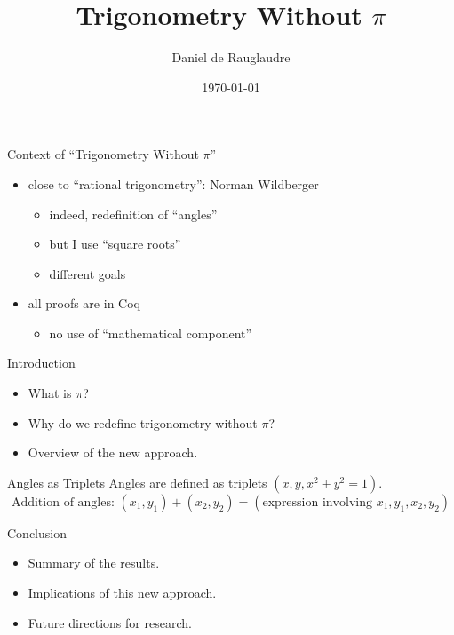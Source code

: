 \documentclass{beamer}
\title{Trigonometry Without $\pi$}
\author{Daniel de Rauglaudre}
\date{\today}
\begin{document}
\begin{frame}
    \titlepage
\end{frame}

\begin{frame}{}
\end{frame}

\begin{frame}{Context of ``Trigonometry Without $\pi$''}
  \begin{itemize}
    \item close to ``rational trigonometry'':  Norman Wildberger
      \begin{itemize}
      \item indeed, redefinition of ``angles''
      \item but I use ``square roots''
      \item different goals
      \end{itemize}
    \item all proofs are in Coq
      \begin{itemize}
      \item no use of ``mathematical component''
      \end{itemize}
  \end{itemize}
\end{frame}

\begin{frame}{Introduction}
    \begin{itemize}
        \item What is $\pi$?
        \item Why do we redefine trigonometry without $\pi$?
        \item Overview of the new approach.
    \end{itemize}
\end{frame}

\begin{frame}{Angles as Triplets}
    Angles are defined as triplets $(x, y, x^2 + y^2 = 1)$.
    \begin{equation}
        \text{Addition of angles: } (x_1, y_1) + (x_2, y_2) = (\text{expression involving } x_1, y_1, x_2, y_2)
    \end{equation}
\end{frame}

\begin{frame}{Conclusion}
    \begin{itemize}
        \item Summary of the results.
        \item Implications of this new approach.
        \item Future directions for research.
    \end{itemize}
\end{frame}
\end{document}
